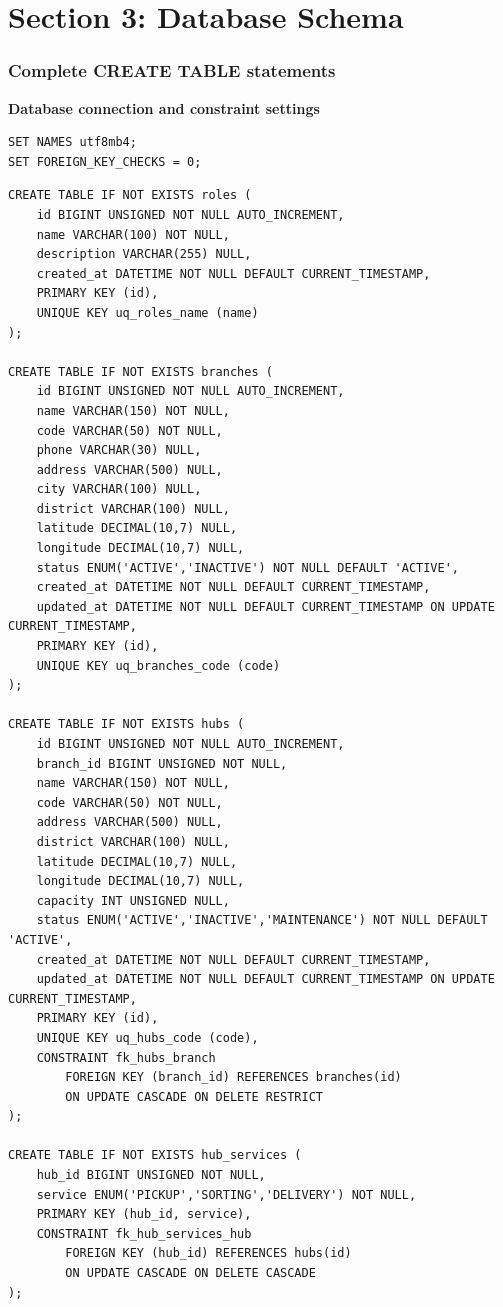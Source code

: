 \documentclass[11pt,a4paper]{article}
\begin{document}
\section{Section 3: Database Schema}
\subsubsection{Complete CREATE TABLE statements}
\textbf{Database connection and constraint settings}
\begin{lstlisting}
SET NAMES utf8mb4;
SET FOREIGN_KEY_CHECKS = 0;
\end{lstlisting}
\begin{lstlisting}
CREATE TABLE IF NOT EXISTS roles (
    id BIGINT UNSIGNED NOT NULL AUTO_INCREMENT,
    name VARCHAR(100) NOT NULL,
    description VARCHAR(255) NULL,
    created_at DATETIME NOT NULL DEFAULT CURRENT_TIMESTAMP,
    PRIMARY KEY (id),
    UNIQUE KEY uq_roles_name (name)
);

CREATE TABLE IF NOT EXISTS branches (
    id BIGINT UNSIGNED NOT NULL AUTO_INCREMENT,
    name VARCHAR(150) NOT NULL,
    code VARCHAR(50) NOT NULL,
    phone VARCHAR(30) NULL,
    address VARCHAR(500) NULL,
    city VARCHAR(100) NULL,
    district VARCHAR(100) NULL,
    latitude DECIMAL(10,7) NULL,
    longitude DECIMAL(10,7) NULL,
    status ENUM('ACTIVE','INACTIVE') NOT NULL DEFAULT 'ACTIVE',
    created_at DATETIME NOT NULL DEFAULT CURRENT_TIMESTAMP,
    updated_at DATETIME NOT NULL DEFAULT CURRENT_TIMESTAMP ON UPDATE CURRENT_TIMESTAMP,
    PRIMARY KEY (id),
    UNIQUE KEY uq_branches_code (code)
);

CREATE TABLE IF NOT EXISTS hubs (
    id BIGINT UNSIGNED NOT NULL AUTO_INCREMENT,
    branch_id BIGINT UNSIGNED NOT NULL,
    name VARCHAR(150) NOT NULL,
    code VARCHAR(50) NOT NULL,
    address VARCHAR(500) NULL,
    district VARCHAR(100) NULL,
    latitude DECIMAL(10,7) NULL,
    longitude DECIMAL(10,7) NULL,
    capacity INT UNSIGNED NULL,
    status ENUM('ACTIVE','INACTIVE','MAINTENANCE') NOT NULL DEFAULT 'ACTIVE',
    created_at DATETIME NOT NULL DEFAULT CURRENT_TIMESTAMP,
    updated_at DATETIME NOT NULL DEFAULT CURRENT_TIMESTAMP ON UPDATE CURRENT_TIMESTAMP,
    PRIMARY KEY (id),
    UNIQUE KEY uq_hubs_code (code),
    CONSTRAINT fk_hubs_branch
        FOREIGN KEY (branch_id) REFERENCES branches(id)
        ON UPDATE CASCADE ON DELETE RESTRICT
);

CREATE TABLE IF NOT EXISTS hub_services (
    hub_id BIGINT UNSIGNED NOT NULL,
    service ENUM('PICKUP','SORTING','DELIVERY') NOT NULL,
    PRIMARY KEY (hub_id, service),
    CONSTRAINT fk_hub_services_hub
        FOREIGN KEY (hub_id) REFERENCES hubs(id)
        ON UPDATE CASCADE ON DELETE CASCADE
);


\end{lstlisting}
\end{document}
